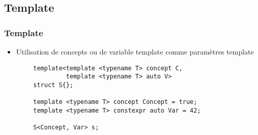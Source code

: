 \documentclass[C++.tex]{subfiles}
\begin{document}
\subsection*{Template}
\begin{frame}[fragile]
	\frametitle{Template}
	\begin{itemize}
		\item Utilisation de concepts ou de variable template comme paramètres template
	\end{itemize}

	\begin{verbatim}
		template<template <typename T> concept C,
		         template <typename T> auto V>
		struct S{};

		template <typename T> concept Concept = true;
		template <typename T> constexpr auto Var = 42;

		S<Concept, Var> s;
	\end{verbatim}

\end{frame}
\end{document}
